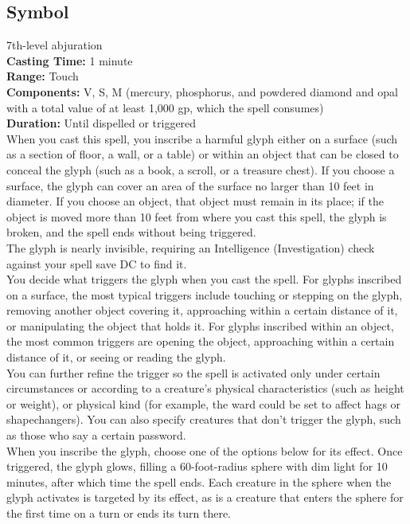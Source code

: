 \documentclass[11pt, A4paper, english]{article}
\begin{document}
		\subsection{Symbol}
7th-level abjuration \\
\textbf{Casting Time:} 1 minute \\
\textbf{Range:} Touch \\
\textbf{Components:} V, S, M (mercury, phosphorus, and powdered diamond and opal with a total value of at least 1,000 gp, which the spell consumes) \\
\textbf{Duration:} Until dispelled or triggered \\
When you cast this spell, you inscribe a harmful glyph either on a surface (such as a section of floor, a wall, or a table) or within an object that can be closed to conceal the glyph (such as a book, a scroll, or a treasure chest). If you choose a surface, the glyph can cover an area of the surface no larger than 10 feet in diameter. If you choose an object, that object must remain in its place; if the object is moved more than 10 feet from where you cast this spell, the glyph is broken, and the spell ends without being triggered. \\
The glyph is nearly invisible, requiring an Intelligence (Investigation) check against your spell save DC to find it. \\
You decide what triggers the glyph when you cast the spell. For glyphs inscribed on a surface, the most typical triggers include touching or stepping on the glyph, removing another object covering it, approaching within a certain distance of it, or manipulating the object that holds it. For glyphs inscribed within an object, the most common triggers are opening the object, approaching within a certain distance of it, or seeing or reading the glyph. \\
You can further refine the trigger so the spell is activated only under certain circumstances or according to a creature’s physical characteristics (such as height or weight), or physical kind (for example, the ward could be set to affect hags or shapechangers). You can also specify creatures that don’t trigger the glyph, such as those who say a certain password. \\
When you inscribe the glyph, choose one of the options below for its effect. Once triggered, the glyph glows, filling a 60-foot-radius sphere with dim light for 10 minutes, after which time the spell ends. Each creature in the sphere when the glyph activates is targeted by its effect, as is a creature that enters the sphere for the first time on a turn or ends its turn there. \\
\end{document}
